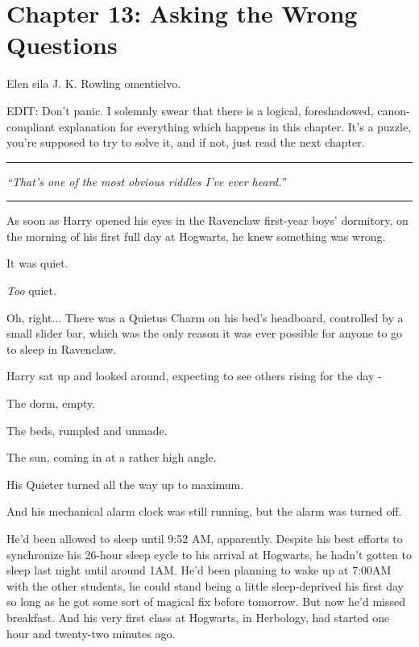 \chapter{Chapter 13: Asking the Wrong Questions}
Elen sila J. K. Rowling omentielvo.

EDIT: Don't panic. I solemnly swear that there is a logical, foreshadowed, canon-compliant explanation for everything which happens in this chapter. It's a puzzle, you're supposed to try to solve it, and if not, just read the next chapter.

\begin{center}\rule{3in}{0.4pt}\end{center}

\emph{``That's one of the most obvious riddles I've ever heard.''}

\begin{center}\rule{3in}{0.4pt}\end{center}

As soon as Harry opened his eyes in the Ravenclaw first-year boys' dormitory, on the morning of his first full day at Hogwarts, he knew something was wrong.

It was quiet.

\emph{Too} quiet.

Oh, right... There was a Quietus Charm on his bed's headboard, controlled by a small slider bar, which was the only reason it was ever possible for anyone to go to sleep in Ravenclaw.

Harry sat up and looked around, expecting to see others rising for the day -

The dorm, empty.

The beds, rumpled and unmade.

The sun, coming in at a rather high angle.

His Quieter turned all the way up to maximum.

And his mechanical alarm clock was still running, but the alarm was turned off.

He'd been allowed to sleep until 9:52 AM, apparently. Despite his best efforts to synchronize his 26-hour sleep cycle to his arrival at Hogwarts, he hadn't gotten to sleep last night until around 1AM. He'd been planning to wake up at 7:00AM with the other students, he could stand being a little sleep-deprived his first day so long as he got some sort of magical fix before tomorrow. But now he'd missed breakfast. And his very first class at Hogwarts, in Herbology, had started one hour and twenty-two minutes ago.


